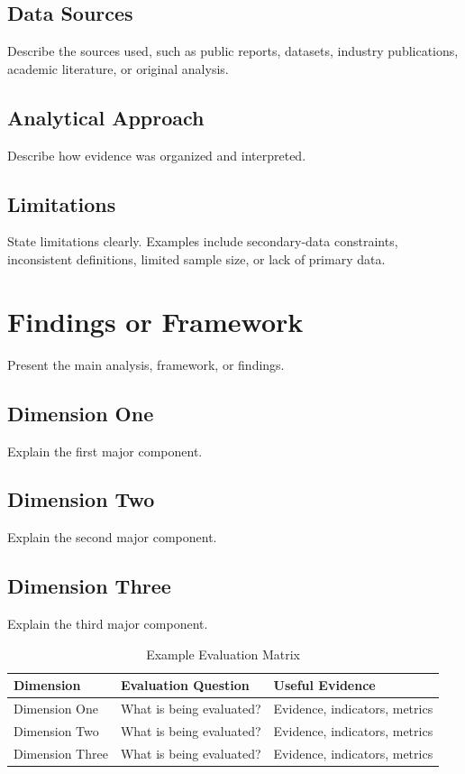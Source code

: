 \documentclass[11pt]{article}
\begin{document}
\subsection{Data Sources}

Describe the sources used, such as public reports, datasets, industry publications, academic literature, or original analysis.

\subsection{Analytical Approach}

Describe how evidence was organized and interpreted.

\subsection{Limitations}

State limitations clearly. Examples include secondary-data constraints, inconsistent definitions, limited sample size, or lack of primary data.

\section{Findings or Framework}

Present the main analysis, framework, or findings.

\subsection{Dimension One}

Explain the first major component.

\subsection{Dimension Two}

Explain the second major component.

\subsection{Dimension Three}

Explain the third major component.

\begin{table}[h]
\centering
\caption{Example Evaluation Matrix}
\begin{tabular}{p{3.2cm} p{4.6cm} p{5cm}}
\toprule
\textbf{Dimension} & \textbf{Evaluation Question} & \textbf{Useful Evidence} \\
\midrule
Dimension One & What is being evaluated? & Evidence, indicators, metrics \\
Dimension Two & What is being evaluated? & Evidence, indicators, metrics \\
Dimension Three & What is being evaluated? & Evidence, indicators, metrics \\
\bottomrule
\end{tabular}
\end{table}
\end{document}
